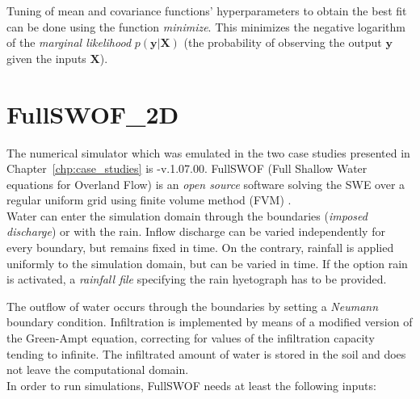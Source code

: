 Tuning of mean and covariance functions' hyperparameters to obtain the best fit can be done using the function \emph{minimize}. This minimizes the negative logarithm of the \emph{marginal likelihood} $p(\bm{y}\vert \bm{X})$ (the probability of observing the output $\bm{y}$ given the inputs $\bm{X}$).
 
\section{FullSWOF\_2D}\label{sec:simulator}

The numerical simulator which was emulated in the two case studies presented in Chapter~\ref{chp:case_studies} is -v.1.07.00. FullSWOF (Full Shallow Water equations for Overland Flow) is an \emph{open source} software solving the SWE over a regular uniform grid using finite volume method (FVM) \autocite{the_fullswof_team_fullswof_2018}.\\
 
Water can enter the simulation domain through the boundaries (\emph{imposed discharge}) or with the rain.
Inflow discharge can be varied independently for every boundary, but remains fixed in time.
On the contrary, rainfall is applied uniformly to the simulation domain, but can be varied in time. If the option rain is activated, a \emph{rainfall file} specifying the rain hyetograph has to be provided.

The outflow of water occurs through the boundaries by setting a \emph{Neumann} boundary condition.
Infiltration is implemented by means of a modified version of the Green-Ampt equation, correcting for values of the infiltration capacity tending to infinite.
The infiltrated amount of water is stored in the soil and does not leave the computational domain.\\

\noindent In order to run simulations, FullSWOF needs at least the following inputs:

